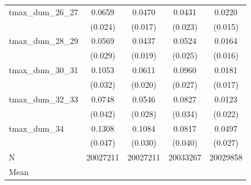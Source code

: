 {\begin{tabular}{l*{4}{c}}
tmax\_dum\_26\_27&      0.0659\sym{***}&      0.0470\sym{***}&      0.0431\sym{*}  &      0.0220         \\
            &     (0.024)         &     (0.017)         &     (0.023)         &     (0.015)         \\
tmax\_dum\_28\_29&      0.0569\sym{**} &      0.0437\sym{**} &      0.0524\sym{**} &      0.0164         \\
            &     (0.029)         &     (0.019)         &     (0.025)         &     (0.016)         \\
tmax\_dum\_30\_31&      0.1053\sym{***}&      0.0611\sym{***}&      0.0960\sym{***}&      0.0181         \\
            &     (0.032)         &     (0.020)         &     (0.027)         &     (0.017)         \\
tmax\_dum\_32\_33&      0.0748\sym{*}  &      0.0546\sym{*}  &      0.0827\sym{**} &      0.0123         \\
            &     (0.042)         &     (0.028)         &     (0.034)         &     (0.022)         \\
tmax\_dum\_34 &      0.1308\sym{***}&      0.1084\sym{***}&      0.0817\sym{**} &      0.0497\sym{*}  \\
            &     (0.047)         &     (0.030)         &     (0.040)         &     (0.027)         \\
\midrule
N           &    20027211         &    20027211         &    20033267         &    20029858         \\
Mean        &                     &                     &                     &                     \\
\bottomrule
\end{tabular}
}
